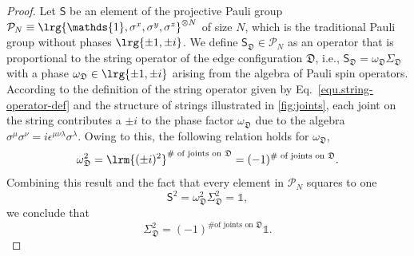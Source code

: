 \begin{proof}
    Let $\mathsf{S}$ be an element of the projective Pauli group $\mathcal{P}_N \equiv \lrg{\mathds{1}, \sigma^x, \sigma^y, \sigma^z}^{\otimes N}$ of size $N$, which is the traditional Pauli group without phases $\lrg{\pm 1, \pm i}$. We define $\mathsf{S}_{\mathfrak{D}} \in \mathcal{P}_N$ as an operator that is proportional to the string operator of the edge configuration $\mathfrak{D}$, i.e., $\mathsf{S}_\mathfrak{D} = \omega_\mathfrak{D} \Sigma_\mathfrak{D}$ with a phase $\omega_\mathfrak{D}\in\lrg{\pm1, \pm i}$ arising from the algebra of Pauli spin operators. According to the definition of the string operator given by Eq.~\eqref{equ.string-operator-def}
    and the structure of strings illustrated in \autoref{fig:joints}, each joint on the string contributes a $\pm i$ to the phase factor $\omega_\mathfrak{D}$ due to the algebra $\sigma^\mu\sigma^\nu = i\epsilon^{\mu\nu\lambda}\sigma^\lambda$. Owing to this, the following relation holds for $\omega_\mathfrak{D}$,
    \[
    \omega_\mathfrak{D}^2 = \lrm{(\pm i)^{2}}^{\text{\# of joints on $\mathfrak{D}$}} = (-1)^{\text{\# of joints on $\mathfrak{D}$}}.
    \]
    Combining this result and the fact that every element in $\mathcal{P}_N$ squares to one
    \[
    \mathsf{S}^2 = \omega_\mathfrak{D}^2\Sigma_\mathfrak{D}^2  = \mathds{1},
    \]
    we conclude that 
    \begin{equation}\label{eq:sigma-joints}
        \Sigma_\mathfrak{D}^2 = (-1)^{\text{\# of joints on $\mathfrak{D}$}} \mathds{1}.
    \end{equation}
    

\end{proof}
